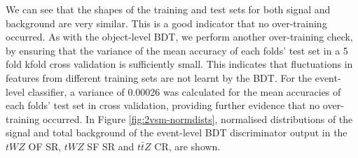 We can see that the shapes of the training and test sets for both signal and background are very similar. This is a good indicator that no over-training occurred. As with the object-level BDT, we perform another over-training check, by ensuring that the variance of the mean accuracy of each folds' test set in a 5 fold kfold cross validation is sufficiently small. This indicates that fluctuations in features from different training sets are not learnt by the BDT. For the event-level classifier, a variance of 0.00026 was calculated for the mean accuracies of each folds' test set in cross validation, providing further evidence that no over-training occurred. In Figure \ref{fig:2vsm-normdists}, normalised distributions of the signal and total background of the event-level BDT discriminator output in the $tWZ$ OF SR, $tWZ$ SF SR and $t\bar{t}Z$ CR, are shown. 

